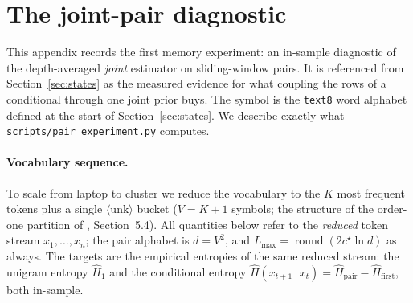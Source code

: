 \documentclass[11pt]{article}
\newcommand{\cstar}{c^\star}
\begin{document}
\appendix

\section{The joint-pair diagnostic}
\label{sec:pairs}

This appendix records the first memory experiment: an in-sample
diagnostic of the depth-averaged \emph{joint} estimator on
sliding-window pairs.  It is referenced from
Section~\ref{sec:states} as the measured evidence for what coupling
the rows of a conditional through one joint prior buys.  The symbol is
the \texttt{text8} word alphabet defined at the start of
Section~\ref{sec:states}.  We describe exactly what \texttt{scripts/pair\_experiment.py}
computes.

\paragraph{Vocabulary sequence.}
To scale from laptop to cluster we reduce the vocabulary to the $K$ most
frequent tokens plus a single $\langle\mathrm{unk}\rangle$ bucket
($V=K+1$ symbols; the structure of the order-one partition of
\cite{layered2026}, Section~5.4).  All quantities below refer to the
\emph{reduced} token stream $x_1,\dots,x_n$; the pair alphabet is
$d=V^2$, and $L_{\max}=\operatorname{round}(2\cstar\ln d)$ as always.  The
targets are the empirical entropies of the same reduced stream: the unigram
entropy $\hat H_1$ and the conditional entropy
$\hat H(x_{t+1}\,|\,x_t)=\hat H_{\text{pair}}-\hat H_{\text{first}}$, both
in-sample.
\end{document}
